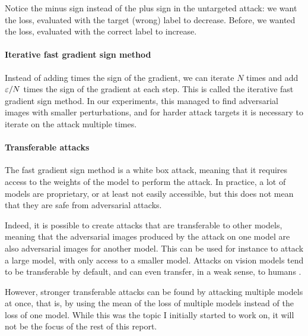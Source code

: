 \documentclass[]{scrarticle}
\begin{document}
Notice the minus sign instead of the plus sign in the untargeted attack:
we want the loss, evaluated with the target (wrong) label
to decrease. Before, we wanted the loss, evaluated with the correct label
to increase.

\paragraph{Iterative fast gradient sign method}
Instead of adding \e times the sign of the gradient, we can iterate
$N$ times and add $\varepsilon / N$ times the sign of the gradient at each step.
This is called the iterative fast gradient sign method.
In our experiments, this managed to find adversarial images with
smaller perturbations, and for harder attack targets it
is necessary to iterate on the attack multiple times.



\paragraph{Transferable attacks}
The fast gradient sign method is a white box attack,
meaning that it requires access to the weights of the model
to perform the attack. In practice, a lot of models are proprietary,
or at least not easily accessible, but this does not mean that
they are safe from adversarial attacks.

Indeed, it is possible to create attacks that are transferable
to other models, meaning that the adversarial images produced
by the attack on one model are also adversarial images for another model.
This can be used for instance to attack a large model, with
only access to a smaller model.
Attacks on vision models tend to be transferable by default,
and can even transfer, in a weak sense, to humans \cite{Elsayed2018AdversarialET}.

However, stronger transferable attacks can be found by
attacking multiple models at once, that is, by using
the mean of the loss of multiple models instead of the loss of one model.
While this was the topic I initially started to work on,
it will not be the focus of the rest of this report.


\end{document}
